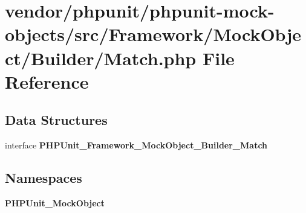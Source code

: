 \section{vendor/phpunit/phpunit-\/mock-\/objects/src/\+Framework/\+Mock\+Object/\+Builder/\+Match.php File Reference}
\label{_match_8php}
\subsection*{Data Structures}
\begin{DoxyCompactItemize}
\item 
interface {\bf P\+H\+P\+Unit\+\_\+\+Framework\+\_\+\+Mock\+Object\+\_\+\+Builder\+\_\+\+Match}
\end{DoxyCompactItemize}
\subsection*{Namespaces}
\begin{DoxyCompactItemize}
\item 
 {\bf P\+H\+P\+Unit\+\_\+\+Mock\+Object}
\end{DoxyCompactItemize}
